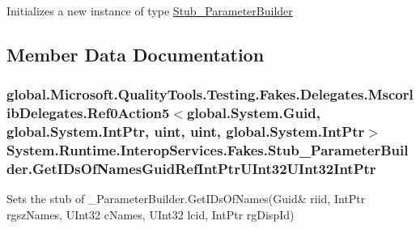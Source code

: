 Initializes a new instance of type \hyperlink{class_system_1_1_runtime_1_1_interop_services_1_1_fakes_1_1_stub___parameter_builder}{Stub\-\_\-\-Parameter\-Builder}



\subsection{Member Data Documentation}
\hypertarget{class_system_1_1_runtime_1_1_interop_services_1_1_fakes_1_1_stub___parameter_builder_a86d31cd158889841f604e3d29beee061}{
\subsubsection[{Get\-I\-Ds\-Of\-Names\-Guid\-Ref\-Int\-Ptr\-U\-Int32\-U\-Int32\-Int\-Ptr}]{\setlength{\rightskip}{0pt plus 5cm}global.\-Microsoft.\-Quality\-Tools.\-Testing.\-Fakes.\-Delegates.\-Mscorlib\-Delegates.\-Ref0\-Action5$<$global.\-System.\-Guid, global.\-System.\-Int\-Ptr, uint, uint, global.\-System.\-Int\-Ptr$>$ System.\-Runtime.\-Interop\-Services.\-Fakes.\-Stub\-\_\-\-Parameter\-Builder.\-Get\-I\-Ds\-Of\-Names\-Guid\-Ref\-Int\-Ptr\-U\-Int32\-U\-Int32\-Int\-Ptr}}\label{class_system_1_1_runtime_1_1_interop_services_1_1_fakes_1_1_stub___parameter_builder_a86d31cd158889841f604e3d29beee061}


Sets the stub of \-\_\-\-Parameter\-Builder.\-Get\-I\-Ds\-Of\-Names(Guid\& riid, Int\-Ptr rgsz\-Names, U\-Int32 c\-Names, U\-Int32 lcid, Int\-Ptr rg\-Disp\-Id)

